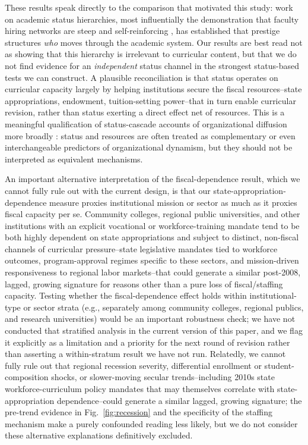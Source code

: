 \documentclass[11pt, letterpaper]{article}
\newcommand{\parencite}[1]{\cite{#1}}
\begin{document}
These results speak directly to the comparison that motivated this study: work on academic status hierarchies, most influentially the demonstration that faculty hiring networks are steep and self-reinforcing \parencite{clauset2015}, has established that prestige structures \emph{who} moves through the academic system. Our results are best read not as showing that this hierarchy is irrelevant to curricular content, but that we do not find evidence for an \emph{independent} status channel in the strongest status-based tests we can construct. A plausible reconciliation is that status operates on curricular capacity largely by helping institutions secure the fiscal resources--state appropriations, endowment, tuition-setting power--that in turn enable curricular revision, rather than status exerting a direct effect net of resources. This is a meaningful qualification of status-cascade accounts of organizational diffusion more broadly \parencite{strangsoule1998, dimaggiopowell1983}: status and resources are often treated as complementary or even interchangeable predictors of organizational dynamism, but they should not be interpreted as equivalent mechanisms.

An important alternative interpretation of the fiscal-dependence result, which we cannot fully rule out with the current design, is that our state-appropriation-dependence measure proxies institutional mission or sector as much as it proxies fiscal capacity per se. Community colleges, regional public universities, and other institutions with an explicit vocational or workforce-training mandate tend to be both highly dependent on state appropriations and subject to distinct, non-fiscal channels of curricular pressure--state legislative mandates tied to workforce outcomes, program-approval regimes specific to these sectors, and mission-driven responsiveness to regional labor markets--that could generate a similar post-2008, lagged, growing signature for reasons other than a pure loss of fiscal/staffing capacity. Testing whether the fiscal-dependence effect holds within institutional-type or sector strata (e.g., separately among community colleges, regional publics, and research universities) would be an important robustness check; we have not conducted that stratified analysis in the current version of this paper, and we flag it explicitly as a limitation and a priority for the next round of revision rather than asserting a within-stratum result we have not run. Relatedly, we cannot fully rule out that regional recession severity, differential enrollment or student-composition shocks, or slower-moving secular trends--including 2010s state workforce-curriculum policy mandates that may themselves correlate with state-appropriation dependence--could generate a similar lagged, growing signature; the pre-trend evidence in Fig.~\ref{fig:recession} and the specificity of the staffing mechanism make a purely confounded reading less likely, but we do not consider these alternative explanations definitively excluded.
\end{document}
